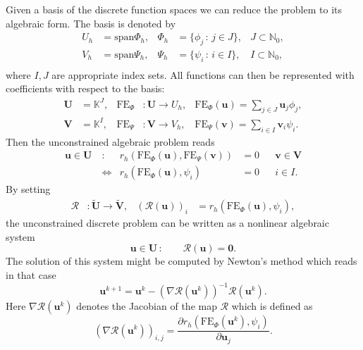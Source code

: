 Given a basis of the discrete function spaces we can reduce the
problem to its algebraic form. The basis is denoted by
\begin{align*}
U_h &= \text{span} \Phi_h, & \Phi_h &= \{\phi_j \,:\, j\in J\}, &
J\subset \mathbb{N}_0,\\
V_h &= \text{span} \Psi_h, & \Psi_h &= \{\psi_i \,:\, i\in I\}, &
I\subset \mathbb{N}_0,\\
\end{align*}
where $I, J$ are appropriate index sets. All functions can then be
represented with coefficients with respect to the basis:
\begin{align*}
\mathbf{U} &= \mathbb{K}^J, & \text{FE}_\Phi &: \mathbf{U} \to U_h, &
 \text{FE}_\Phi(\mathbf{u}) = \sum\limits_{j\in J} \mathbf{u}_j \phi_j,\\
\mathbf{V} &= \mathbb{K}^I, & \text{FE}_\Psi &: \mathbf{V} \to V_h, &
 \text{FE}_\Psi(\mathbf{v}) = \sum\limits_{i\in I} \mathbf{v}_i \psi_i.
\end{align*}
Then the unconstrained algebraic problem reads
\begin{align*}
\mathbf{u}\in\mathbf{U}\ &: & r_h(\text{FE}_\Phi(\mathbf{u}),
\text{FE}_\Psi(\mathbf{v})) &= 0 &&\mathbf{v}\in\mathbf{V}\\
&\Leftrightarrow & r_h(\text{FE}_\Phi(\mathbf{u}),
\psi_i) &= 0 &&i\in I.
\end{align*}
By setting 
\begin{align*}
\mathcal{R} &: \tilde{\mathbf{U}}\to\tilde{\mathbf{V}}, &
\left(\mathcal{R}(\mathbf{u})\right)_i &= r_h(\text{FE}_\Phi(\mathbf{u}),\psi_i),
\end{align*}
the unconstrained discrete problem can be written as a nonlinear
algebraic system 
\begin{equation}
\mathbf{u}\in\mathbf{U} \,: \qquad 
\mathcal{R}(\mathbf{u}) = \mathbf{0}.
\end{equation}
The solution of this system might be computed by Newton's method which
reads in that case
\begin{equation}
\mathbf{u}^{k+1} = \mathbf{u}^{k} -
\left(\nabla\mathcal{R}(\mathbf{u}^{k})\right)^{-1}\mathcal{R}(\mathbf{u}^{k}) .
\end{equation}
Here $\nabla\mathcal{R}(\mathbf{u}^{k})$ denotes the Jacobian of the
map $\mathcal{R}$ which is defined as 
\begin{equation*}
\left(\nabla\mathcal{R}(\mathbf{u}^{k})\right)_{i,j} = \frac{\partial
  r_h(\text{FE}_\Phi(\mathbf{u}^k),\psi_i)}{\partial \mathbf{u}_j} .
\end{equation*}

